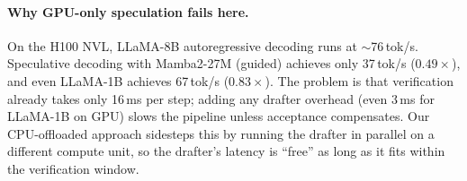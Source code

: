 \paragraph{Why GPU-only speculation fails here.}
On the H100 NVL, LLaMA-8B autoregressive decoding runs at $\sim$76\,tok/s.
Speculative decoding with Mamba2-27M (guided) achieves only 37\,tok/s ($0.49\times$), and even LLaMA-1B achieves 67\,tok/s ($0.83\times$).
The problem is that verification already takes only 16\,ms per step; adding any drafter overhead (even 3\,ms for LLaMA-1B on GPU) slows the pipeline unless acceptance compensates.
Our CPU-offloaded approach sidesteps this by running the drafter in parallel on a different compute unit, so the drafter's latency is ``free'' as long as it fits within the verification window.
